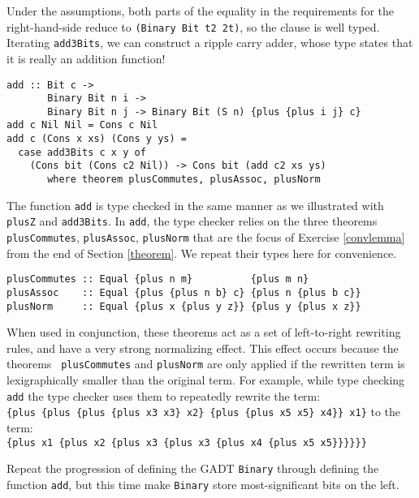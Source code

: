 \documentclass[11pt,twoside,A4]{llncs}
\begin{document}
Under the assumptions, both parts of the equality in the requirements
for the right-hand-side reduce to
\verb+(Binary Bit t2 2t)+, so the clause is well typed.
Iterating \verb+add3Bits+, we can construct a ripple carry adder, whose type
states that it is really an addition function!

{\small
\begin{verbatim}
add :: Bit c -> 
       Binary Bit n i -> 
       Binary Bit n j -> Binary Bit (S n) {plus {plus i j} c}
add c Nil Nil = Cons c Nil
add c (Cons x xs) (Cons y ys) = 
  case add3Bits c x y of
    (Cons bit (Cons c2 Nil)) -> Cons bit (add c2 xs ys)
       where theorem plusCommutes, plusAssoc, plusNorm
\end{verbatim}}

The function \verb+add+ is type checked in the same manner as we illustrated
with \verb+plusZ+ and \verb+add3Bits+. In  \verb+add+, the type
checker relies on the three theorems \verb+plusCommutes+, \verb+plusAssoc+, 
\verb+plusNorm+ that are the focus of Exercise \ref{convlemma} from the end of Section \ref{theorem}.
We repeat their types here for convenience.

{\small
\begin{verbatim}
plusCommutes :: Equal {plus n m}          {plus m n}
plusAssoc    :: Equal {plus {plus n b} c} {plus n {plus b c}}
plusNorm     :: Equal {plus x {plus y z}} {plus y {plus x z}}
\end{verbatim}}

When used in conjunction, these theorems act as a set of left-to-right rewriting rules,
and have a very strong normalizing effect. This effect occurs because the theorems {\tt
plusCommutes} and {\tt plusNorm} are only applied if the rewritten term is
lexigraphically smaller than the original term. For example, while type checking {\tt
add} the type checker uses them to repeatedly rewrite the term:\\ 
\verb+{plus {plus {plus {plus x3 x3} x2} {plus {plus x5 x5} x4}} x1}+ \hspace*{.5in} to the term:\\ 
\verb+{plus x1 {plus x2 {plus x3 {plus x3 {plus x4 {plus x5 x5}}}}}}+


\begin{exercise}
Repeat the progression of defining the GADT {\tt Binary} through
defining the function {\tt add}, but this time make {\tt Binary}
store most-significant bits on the left.
\end{exercise}
\end{document}
